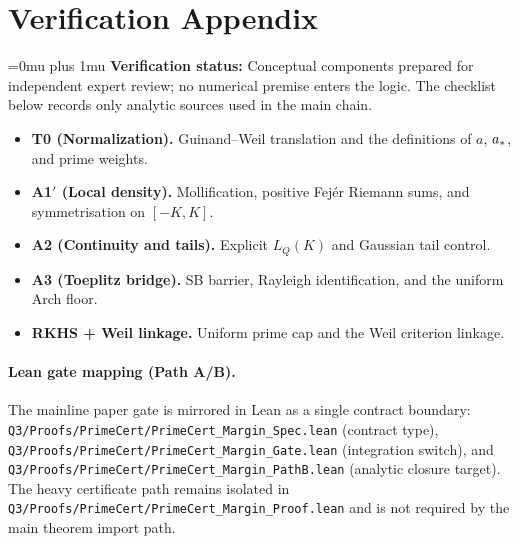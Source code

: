 \section{Verification Appendix}\label{sec:verification}
\begingroup
\sloppy
\Urlmuskip=0mu plus 1mu
\renewcommand{\UrlFont}{\ttfamily\small}
\textbf{Verification status:} Conceptual components prepared for independent expert review; no numerical premise enters the logic. The checklist below records only analytic sources used in the main chain.
\begin{itemize}[leftmargin=2.2em]
  \item \textbf{T0 (Normalization).} Guinand--Weil translation and the definitions of $a$, $a_*$, and prime weights.
  \item \textbf{A1$'$ (Local density).} Mollification, positive Fej\'er Riemann sums, and symmetrisation on $[-K,K]$.
  \item \textbf{A2 (Continuity and tails).} Explicit $L_Q(K)$ and Gaussian tail control.
  \item \textbf{A3 (Toeplitz bridge).} SB barrier, Rayleigh identification, and the uniform Arch floor.
  \item \textbf{RKHS + Weil linkage.} Uniform prime cap and the Weil criterion linkage.
\end{itemize}

\paragraph{Lean gate mapping (Path A/B).}
The mainline paper gate is mirrored in Lean as a single contract boundary:
\texttt{Q3/Proofs/PrimeCert/PrimeCert\_Margin\_Spec.lean} (contract type),
\texttt{Q3/Proofs/PrimeCert/PrimeCert\_Margin\_Gate.lean} (integration switch),
and \texttt{Q3/Proofs/PrimeCert/PrimeCert\_Margin\_PathB.lean} (analytic closure target).
The heavy certificate path remains isolated in
\texttt{Q3/Proofs/PrimeCert/PrimeCert\_Margin\_Proof.lean} and is not required by the main theorem import path.

